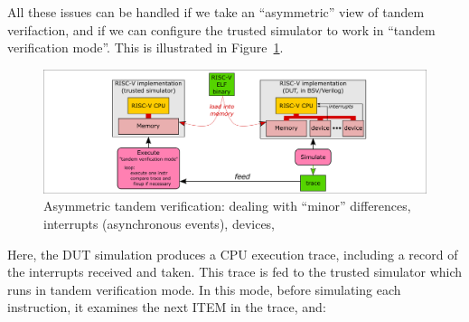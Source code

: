 All these issues can be handled if we take an ``asymmetric'' view of
tandem verifaction, and if we can configure the trusted simulator to
work in ``tandem verification mode''.  This is illustrated in
Figure~\ref{Fig_tandem_verification_II}.
\begin{figure}[htbp]
  \centerline{\includegraphics[width=6in,angle=0]{Figures/Fig_tandem_verification_II}}
  \caption{\label{Fig_tandem_verification_II}
           Asymmetric tandem verification: dealing with ``minor'' differences,
           interrupts (asynchronous events), devices, {\etc}}
\end{figure}

Here, the DUT simulation produces a CPU execution trace, including a
record of the interrupts received and taken.  This trace is fed to the
trusted simulator which runs in tandem verification mode.  In this
mode, before simulating each instruction, it examines the next ITEM in
the trace, and:

